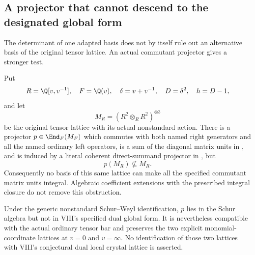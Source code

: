 \subsection{A projector that cannot descend to the designated global form}
The determinant of one adapted basis does not by itself rule out
an alternative basis of the original tensor lattice. An actual
commutant projector gives a stronger test.

\begin{finding}\label{f:globallattice}
Put
\[
 R=\Q[v,v^{-1}],\quad F=\Q(v),\quad
 \delta=v+v^{-1},\quad D=\delta^2,\quad h=D-1,
\]
and let
\[
 M_R=(R^2\otimes_R R^2)^{\otimes3}
\]
be the original tensor lattice with its actual nonstandard action.
There is a projector $p\in\End_F(M_F)$ which commutes with both
named right generators and all the named ordinary left operators,
is a sum of the diagonal matrix units in , and is induced
by a literal coherent direct-summand projector in , but
\[
 p(M_R)\not\subseteq M_R.
\]
Consequently no basis of this same lattice can make all the specified
 commutant matrix units integral. Algebraic coefficient
extensions with the prescribed integral closure do not remove this
obstruction.

Under the generic nonstandard Schur--Weyl identification, $p$ lies
in the Schur algebra but not in VIII's specified dual global form.
It is nevertheless compatible with the actual ordinary tensor bar
and preserves the two explicit monomial-coordinate lattices at
$v=0$ and $v=\infty$. No identification of those two lattices with
VIII's conjectural dual local crystal lattice is asserted.
\end{finding}

